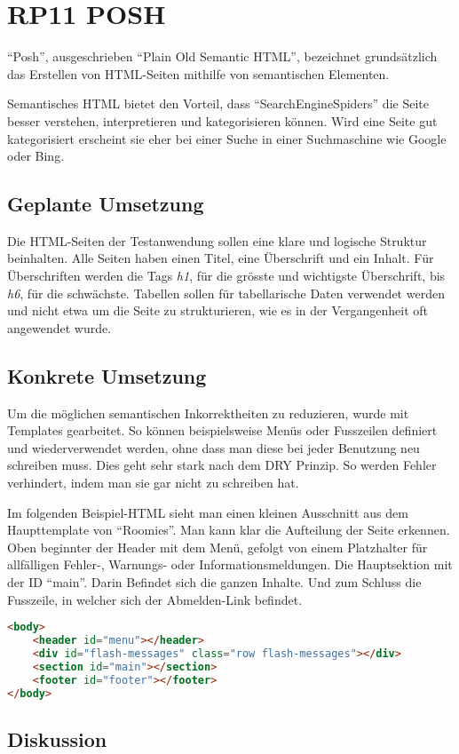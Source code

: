 \section{RP11 POSH}
\label{sec:principle-rp11-posh}

``Posh'', ausgeschrieben ``Plain Old Semantic HTML'', bezeichnet grundsätzlich das Erstellen von HTML-Seiten mithilfe von semantischen Elementen. \cite{SemanticHTML}

Semantisches HTML bietet den Vorteil, dass ``\glspl{SearchEngineSpider}'' die Seite besser verstehen, interpretieren und kategorisieren können. Wird eine Seite gut kategorisiert erscheint sie eher bei einer Suche in einer Suchmaschine wie Google oder Bing.

\subsection*{Geplante Umsetzung}
Die HTML-Seiten der Testanwendung sollen eine klare und logische Struktur beinhalten.
Alle Seiten haben einen Titel, eine Überschrift und ein Inhalt.
Für Überschriften werden die Tags \emph{h1}, für die grösste und wichtigste Überschrift, bis \emph{h6}, für die schwächste.
Tabellen sollen für tabellarische Daten verwendet werden und nicht etwa um die Seite zu strukturieren, wie es in der Vergangenheit oft angewendet wurde.

\subsection*{Konkrete Umsetzung}
Um die möglichen semantischen Inkorrektheiten zu reduzieren, wurde mit Templates gearbeitet. So können beispielsweise Menüs oder Fusszeilen definiert und wiederverwendet werden, ohne dass man diese bei jeder Benutzung neu schreiben muss. Dies geht sehr stark nach dem \gls{DRY} Prinzip. So werden Fehler verhindert, indem man sie gar nicht zu schreiben hat.

Im folgenden Beispiel-HTML sieht man einen kleinen Ausschnitt aus dem Haupttemplate von ``Roomies''. Man kann klar die Aufteilung der Seite erkennen. Oben beginnter der Header mit dem Menü, gefolgt von einem Platzhalter für allfälligen Fehler-, Warnungs- oder Informationsmeldungen. Die Hauptsektion mit der ID ``main''. Darin Befindet sich die ganzen Inhalte. Und zum Schluss die Fusszeile, in welcher sich der Abmelden-Link befindet.

\begin{lstlisting}[language=HTML, caption=Layout Definition \cite{roomiesHtmlSkeleton}, label=lst:layoutDefinition, firstnumber=27]
<body>
	<header id="menu"></header>
	<div id="flash-messages" class="row flash-messages"></div>
	<section id="main"></section>
	<footer id="footer"></footer>
</body>
\end{lstlisting}

\subsection*{Diskussion}
